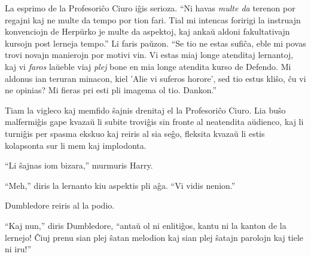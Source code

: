La esprimo de la Profesoriĉo Ciuro iĝis serioza. ``Ni havas
\emph{multe da} terenon por regajni kaj ne multe da tempo por tion
fari. Tial mi intencas foririgi la instruajn konvenciojn de Herpŭrko
je multe da aspektoj, kaj ankaŭ aldoni fakultativajn kursojn post
lerneja tempo.'' Li faris paŭzon. ``Se tio ne estas sufiĉa, eble mi
povas trovi novajn manierojn por motivi vin. Vi estas miaj longe
atenditaj lernantoj, kaj vi \emph{faros} laŭeble viaj \emph{plej} bone
en mia longe atendita kurso de Defendo. Mi aldonus ian teruran
minacon, kiel 'Alie vi suferos horore', sed tio estus kliŝo, ĉu vi ne
opinias?  Mi fieras pri esti pli imagema ol tio. Dankon.''

Tiam la vigleco kaj memfido ŝajnis drenitaj el la Profesoriĉo
Ciuro. Lia buŝo malfermiĝis gape kvazaŭ li subite troviĝis sin fronte
al neatendita aŭdienco, kaj li turniĝis per spasma ekskuo kaj reiris
al sia seĝo, fleksita kvazaŭ li estis kolapsonta sur li mem kaj
implodonta.

``Li ŝajnas iom bizara,'' murmuris Harry.

``Meh,'' diris la lernanto kiu aspektis pli aĝa. ``Vi vidis nenion.''

Dumbledore reiris al la podio.

``Kaj nun,'' diris Dumbledore, ``antaŭ ol ni enlitiĝos, kantu ni la
kanton de la lernejo! Ĉiuj prenu sian plej ŝatan melodion kaj sian
plej ŝatajn parolojn kaj tiele ni iru!''

































